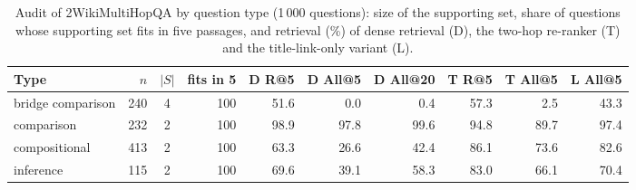 \begin{table}[t]
\centering
\footnotesize
\caption{Audit of 2WikiMultiHopQA by question type (1\,000 questions): size of the supporting set, share of questions whose supporting set fits in five passages, and retrieval (\%) of dense retrieval (D), the two-hop re-ranker (T) and the title-link-only variant (L).}
\label{tab:audit}
\begin{tabular}{lrcrrrrrrr}
\toprule
Type & $n$ & $|S|$ & fits in 5 & D R@5 & D All@5 & D All@20 & T R@5 & T All@5 & L All@5 \\
\midrule
bridge comparison & 240 & 4 & 100 & 51.6 & 0.0 & 0.4 & 57.3 & 2.5 & 43.3 \\
comparison & 232 & 2 & 100 & 98.9 & 97.8 & 99.6 & 94.8 & 89.7 & 97.4 \\
compositional & 413 & 2 & 100 & 63.3 & 26.6 & 42.4 & 86.1 & 73.6 & 82.6 \\
inference & 115 & 2 & 100 & 69.6 & 39.1 & 58.3 & 83.0 & 66.1 & 70.4 \\
\bottomrule
\end{tabular}
\end{table}
